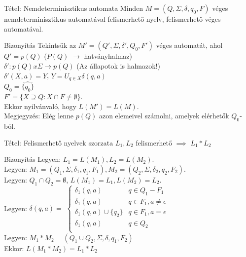 \documentclass{beamer}
\begin{document}
\begin{frame}
\begin{block}{Tétel: Nemdeterminisztikus automata}
Minden $M = (Q, \Sigma , \delta , q_0, F)$ véges nemdeterminisztikus automatával felismerhető nyelv, felismerhető véges automatával.

\end{block}

\begin{block}{Bizonyítás}
Tekintsük az $M' = (Q', \Sigma , {\delta}', Q_0, F')$ véges automatát, ahol\\
$Q' = p(Q)$ ($P(Q)$ $\rightarrow$ hatványhalmaz)\\
${\delta}' : p(Q) x \Sigma \rightarrow p(Q)$ (Az állapotok is halmazok!)\\
${\delta}'(X, a) = \widehat{Y}$, $Y = U_{q \in X} \delta(q, a)$\\
$Q_0 = \widehat{\{q_0\}}$\\
$F' = \{X \supseteq Q : X \cap F \neq \emptyset \}$.\\
Ekkor nyilvánvaló, hogy $L(M') = L(M)$.\\
Megjegyzés: Elég lenne $p(Q)$ azon elemeivel számolni, amelyek elérhetők $Q_0$-ból.

\end{block}

\end{frame}

\begin{frame}
\begin{block}{Tétel: Felismerhető nyelvek szorzata}
$L_1, L_2$ felismerhető $\implies$ $L_1 * L_2$

\end{block}

\begin{block}{Bizonyítás}
Legyen: $L_1 = L(M_1), L_2 = L(M_2)$.\\
Legyen: $M_1 = (Q_1, \Sigma , {\delta}_1, q_1, F_1), M_2 = (Q_2, \Sigma , {\delta}_2, q_2, F_2)$.\\
Legyen: $Q_1 \cap Q_2 = \emptyset$, $L(M_1) = L_1, L(M_2) = L_2$.\\
\bigskip
Legyen: ${\delta}(q, a) = $
$
\begin{cases}
{\delta}_1(q, a) & q \in Q_1 - F_1\\
{\delta}_1(q, a) & q \in F_1, a \neq \epsilon \\
{\delta}_1(q, a) \cup \{q_2\} & q \in F_1, a = \epsilon \\
{\delta}_1(q, a) & q \in Q_2 \\
\end{cases}
$\\
\bigskip
Legyen: $M_1 * M_2 = (Q_1 \cup Q_2, \Sigma , \delta , q_1, F_2)$\\
\bigskip
Ekkor: \textbf{$L(M_1 * M_2) = L_1 * L_2$}\\
\end{block}

\end{frame}
\end{document}
